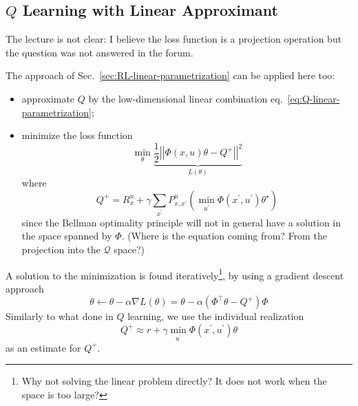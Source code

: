 \subsection{$Q$ Learning with Linear Approximant}

The lecture is not clear: I believe the loss function is a projection operation but the question was not answered in the forum.

The approach of Sec.~\ref{sec:RL-linear-parametrization} can be applied here too:
\begin{itemize}
\item approximate $Q$ by the low-dimensional linear combination eq.~\eqref{eq:Q-linear-parametrization};
\item minimize the loss function
  \begin{equation*}
    \min_\theta \underbrace{\frac{1}{2} \left|\!\left|\Phi(x,u)\theta - Q^+\right|\!\right|^2}_{L(\theta)}
  \end{equation*}
  where
  \begin{equation*}
    Q^+ = R_x^u + \gamma \sum_{x^\prime} P_{x,x^\prime}^u \left(\min_{u^\prime} \Phi(x^\prime,u^\prime)\theta^\star\right)
  \end{equation*}
  since the Bellman optimality principle will not in general have a solution in the space spanned by $\Phi$. (Where is the equation coming from? From the projection into the $\mathcal{Q}$ space?)
\end{itemize}
A solution to the minimization is found iteratively\footnote{Why not solving the linear problem directly? It does not work when the space is too large?}, by using a gradient descent approach
\begin{equation*}
  \theta \leftarrow \theta - \alpha \nabla L(\theta) = \theta - \alpha \left(\Phi^\top\theta - Q^+\right)\Phi
\end{equation*}
Similarly to what done in $Q$ learning, we use the individual realization
\begin{equation*}
  Q^+\approx r + \gamma \min_{u^\prime} \Phi(x^\prime,u^\prime)\theta
\end{equation*}
as an estimate for $Q^+$.



